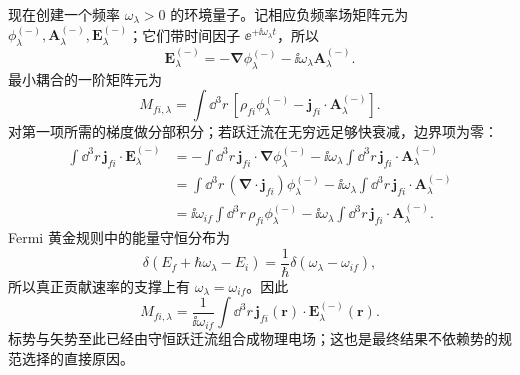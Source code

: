 \begin{derivation}
现在创建一个频率 $\omega_\lambda>0$ 的环境量子。记相应负频率场矩阵元为
$\phi_\lambda^{(-)},\mathbf A_\lambda^{(-)},\mathbf E_\lambda^{(-)}$；它们带时间因子
$\ee^{+\ii\omega_\lambda t}$，所以
\begin{equation*}
\mathbf E_\lambda^{(-)}
=-\boldsymbol\nabla\phi_\lambda^{(-)}
-\ii\omega_\lambda\mathbf A_\lambda^{(-)}.
\end{equation*}
最小耦合的一阶矩阵元为
\begin{equation*}
M_{fi,\lambda}
=\int\dd^3 r\,
[\rho_{fi}\phi_\lambda^{(-)}
-\mathbf j_{fi}\cdot\mathbf A_\lambda^{(-)}].
\end{equation*}
对第一项所需的梯度做分部积分；若跃迁流在无穷远足够快衰减，边界项为零：
\begin{align*}
\int\dd^3 r\,\mathbf j_{fi}\cdot\mathbf E_\lambda^{(-)}
&=-\int\dd^3r\,\mathbf j_{fi}\cdot\boldsymbol\nabla\phi_\lambda^{(-)}
-\ii\omega_\lambda\int\dd^3r\,\mathbf j_{fi}\cdot\mathbf A_\lambda^{(-)}\\
&=\int\dd^3r\,
(\boldsymbol\nabla\cdot\mathbf j_{fi})\phi_\lambda^{(-)}
-\ii\omega_\lambda\int\dd^3r\,\mathbf j_{fi}\cdot\mathbf A_\lambda^{(-)}\\
&=\ii\omega_{if}\int\dd^3r\,\rho_{fi}\phi_\lambda^{(-)}
-\ii\omega_\lambda\int\dd^3r\,\mathbf j_{fi}\cdot\mathbf A_\lambda^{(-)}.
\end{align*}
Fermi 黄金规则中的能量守恒分布为
\begin{equation*}
\delta(E_f+\hbar\omega_\lambda-E_i)
=\frac1\hbar\delta(\omega_\lambda-\omega_{if}),
\end{equation*}
所以真正贡献速率的支撑上有 $\omega_\lambda=\omega_{if}$。因此
\begin{equation*}
\boxed{
M_{fi,\lambda}
=\frac{1}{\ii\omega_{if}}
\int\dd^3 r\,
\mathbf j_{fi}(\mathbf r)\cdot
\mathbf E_\lambda^{(-)}(\mathbf r)}.
\end{equation*}
标势与矢势至此已经由守恒跃迁流组合成物理电场；这也是最终结果不依赖势的规范选择的直接原因。


\end{derivation}
